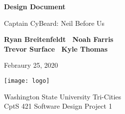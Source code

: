 \begin{titlepage}
    \begin{center}
        \vspace*{1cm}

        \Huge
        \textbf{Design Document}

        \vspace{.5cm}
        \LARGE
        Captain CyBeard: Neil Before Us

        \vspace{1cm}

        \textbf{Ryan Breitenfeldt \textbar\ Noah Farris\\ Trevor Surface \textbar\ Kyle Thomas}

        \vspace{.2cm}
        \Large
        Febraury 25, 2020

        \vspace{2cm}
        \texttt{[image: logo]}

        \vfill

        Washington State University Tri-Cities\\
        CptS 421 Software Design Project 1

    \end{center}
\end{titlepage}

